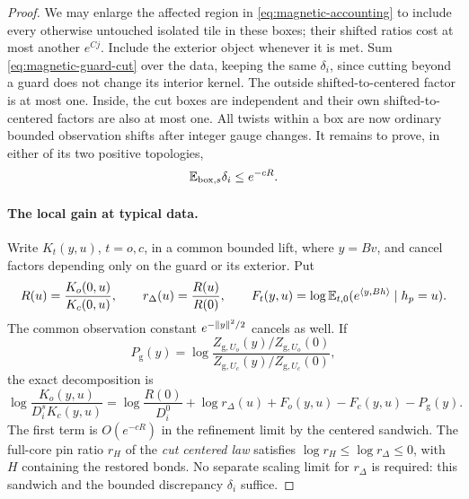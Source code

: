 \begin{proof}
We may enlarge the affected region in
\eqref{eq:magnetic-accounting} to include every otherwise
untouched isolated tile in these boxes; their shifted ratios
cost at most another \(e^{Cj}\). Include the exterior object
whenever it is met. Sum \eqref{eq:magnetic-guard-cut} over the
data, keeping the same \(\delta_i\), since cutting beyond a
guard does not change its interior kernel. The outside
shifted-to-centered factor is at most one. Inside, the cut
boxes are independent and their own shifted-to-centered
factors are also at most one. All twists within a box are now
ordinary bounded observation shifts after integer gauge changes.
It remains to prove, in either of its two positive topologies,
\begin{equation}\label{eq:magnetic-local-gain}
                     \mathbb E_{{\rm box},s}\delta_i\le e^{-cR}.
\end{equation}

\paragraph{The local gain at typical data.}
Write \(K_t(y,u)\), \(t=o,c\), in a common bounded lift,
where \(y=Bv\), and cancel factors depending only on the guard
or its exterior. Put
\[
 R(u)=\frac{K_o(0,u)}{K_c(0,u)},\qquad
 r_\Delta(u)=\frac{R(u)}{R(0)},\qquad
 F_t(y,u)=\log\mathbb E_{t,0}(e^{\langle y,Bh\rangle}\mid h_p=u).
\]
The common observation constant \(e^{-\lVert y\rVert^2/2}\)
cancels as well. If
\[
 P_{\mathrm g}(y)=
 \log\frac{Z_{\mathrm g,U_o}(y)/Z_{\mathrm g,U_o}(0)}
           {Z_{\mathrm g,U_c}(y)/Z_{\mathrm g,U_c}(0)},
\]
the exact decomposition is
\begin{equation}\label{eq:magnetic-kernel-decomposition}
 \log\frac{K_o(y,u)}{D_i^sK_c(y,u)}
   =\log\frac{R(0)}{D_i^0}+\log r_\Delta(u)
       +F_o(y,u)-F_c(y,u)-P_{\mathrm g}(y).
\end{equation}
The first term is \(O(e^{-cR})\) in the refinement limit
by the centered sandwich. The full-core pin ratio \(r_H\)
of the \emph{cut centered law} satisfies
\(\log r_H\le\log r_\Delta\le0\), with \(H\) containing
the restored bonds. No separate scaling limit for
\(r_\Delta\) is required: this sandwich and the bounded
discrepancy \(\delta_i\) suffice.


\end{proof}
